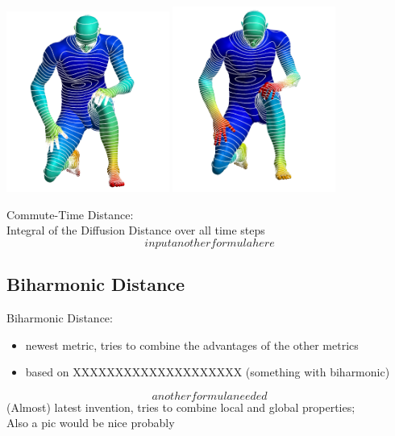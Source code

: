 \documentclass[]{beamer}
\begin{document}
	\begin{frame}
		\begin{center}
			\includegraphics[width=0.4\textwidth]{diffusion_small_t.png}
			\includegraphics[width=0.4\textwidth]{diffusion_big_t.png}
		\end{center}
		
		\pause
		Commute-Time Distance:\\
		Integral of the Diffusion Distance over all time steps
		$$input another formula here$$
	\end{frame}

\subsection{Biharmonic Distance}
	\begin{frame}
		Biharmonic Distance:\\
		\begin{itemize}
			\item newest metric, tries to combine the advantages of the other metrics
			\item based on XXXXXXXXXXXXXXXXXXXX (something with biharmonic)
		\end{itemize}
		$$another formula needed$$
		(Almost) latest invention, tries to combine local and global properties;\\
		Also a pic would be nice probably
	\end{frame}
\end{document}
